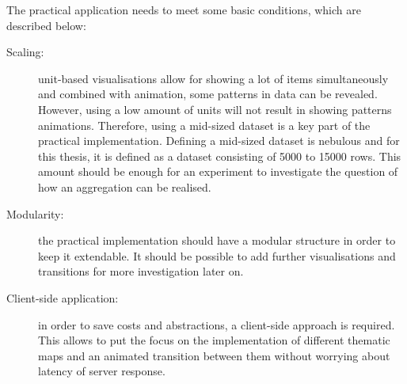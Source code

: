 The practical application needs to meet some basic conditions, which are described below:

\begin{description}
\item[Scaling:] unit-based visualisations allow for showing a lot of items simultaneously and combined with animation, some patterns in data can be revealed. However, using a low amount of units will not result in showing patterns animations. Therefore, using a mid-sized dataset is a key part of the practical implementation. Defining a mid-sized dataset is nebulous and for this thesis, it is defined as a dataset consisting of 5000 to 15000 rows. This amount should be enough for an experiment to investigate the question of how an aggregation can be realised.

\item[Modularity:] the practical implementation should have a modular structure in order to keep it extendable. It should be possible to add further visualisations and transitions for more investigation later on.

\item[Client-side application:] in order to save costs and abstractions, a client-side approach is required. This allows to put the focus on the implementation of different thematic maps and an animated transition between them without worrying about latency of server response.

\end{description}